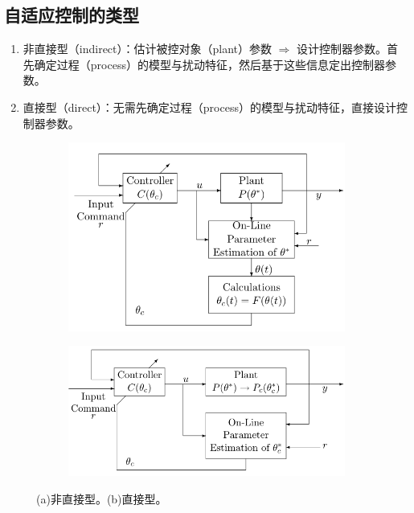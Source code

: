 \subsection{自适应控制的类型}
\begin{enumerate}
      \item 非直接型（indirect）：估计被控对象（plant）参数 $\Rightarrow$ 设计控制器参数。首先确定过程（process）的模型与扰动特征，然后基于这些信息定出控制器参数。
      
      \item 直接型（direct）：无需先确定过程（process）的模型与扰动特征，直接设计控制器参数。
\end{enumerate}
\begin{figure}[htbp]
  \centering
  \begin{subfigure}{0.45\textwidth}
    \includegraphics[width=1\linewidth]{figure/adaptive/indirect.png} %
    \caption{}
\end{subfigure}
  \begin{subfigure}{0.45\textwidth}
    \includegraphics[width=1\linewidth]{figure/adaptive/direct.png} %
    \caption{}
\end{subfigure}
\caption{(a)非直接型。(b)直接型。}
\label{direct_indirect}
\end{figure}

